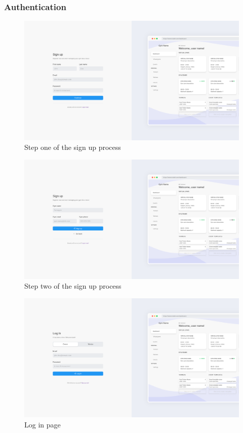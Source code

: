 \documentclass[a4paper, 12pt, oneside]{book}
\begin{document}
\subsubsection{Authentication}
\begin{figure}[H]
	\centering
	\includegraphics[width=\textwidth]{assets/core-screenshots/sign-up-one.png}
	\caption{Step one of the sign up process}
\end{figure}
\begin{figure}[H]
	\centering
	\includegraphics[width=\textwidth]{assets/core-screenshots/sign-up-two.png}
	\caption{Step two of the sign up process}
\end{figure}
\begin{figure}[H]
	\centering
	\includegraphics[width=\textwidth]{assets/core-screenshots/log-in.png}
	\caption{Log in page}
\end{figure}
\end{document}
